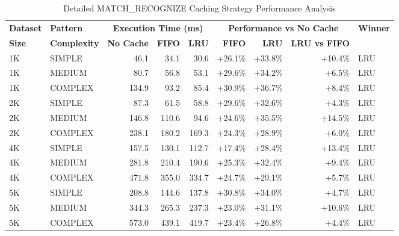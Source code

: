 \begin{table}[htbp]
\centering
\caption{Detailed MATCH\_RECOGNIZE Caching Strategy Performance Analysis}
\label{tab:detailed_performance}
\begin{tabular}{|l|l|r|r|r|r|r|r|l|}
\hline
\textbf{Dataset} & \textbf{Pattern} & \multicolumn{3}{c|}{\textbf{Execution Time (ms)}} & \multicolumn{3}{c|}{\textbf{Performance vs No Cache}} & \textbf{Winner} \\
\textbf{Size} & \textbf{Complexity} & \textbf{No Cache} & \textbf{FIFO} & \textbf{LRU} & \textbf{FIFO} & \textbf{LRU} & \textbf{LRU vs FIFO} & \\
\hline
1K & SIMPLE & 46.1 & 34.1 & 30.6 & +26.1\% & +33.8\% & +10.4\% & LRU \\
1K & MEDIUM & 80.7 & 56.8 & 53.1 & +29.6\% & +34.2\% & +6.5\% & LRU \\
1K & COMPLEX & 134.9 & 93.2 & 85.4 & +30.9\% & +36.7\% & +8.4\% & LRU \\
2K & SIMPLE & 87.3 & 61.5 & 58.8 & +29.6\% & +32.6\% & +4.3\% & LRU \\
2K & MEDIUM & 146.8 & 110.6 & 94.6 & +24.6\% & +35.5\% & +14.5\% & LRU \\
2K & COMPLEX & 238.1 & 180.2 & 169.3 & +24.3\% & +28.9\% & +6.0\% & LRU \\
4K & SIMPLE & 157.5 & 130.1 & 112.7 & +17.4\% & +28.4\% & +13.4\% & LRU \\
4K & MEDIUM & 281.8 & 210.4 & 190.6 & +25.3\% & +32.4\% & +9.4\% & LRU \\
4K & COMPLEX & 471.8 & 355.0 & 334.7 & +24.7\% & +29.1\% & +5.7\% & LRU \\
5K & SIMPLE & 208.8 & 144.6 & 137.8 & +30.8\% & +34.0\% & +4.7\% & LRU \\
5K & MEDIUM & 344.3 & 265.3 & 237.3 & +23.0\% & +31.1\% & +10.6\% & LRU \\
5K & COMPLEX & 573.0 & 439.1 & 419.7 & +23.4\% & +26.8\% & +4.4\% & LRU \\
\hline
\end{tabular}
\end{table}

